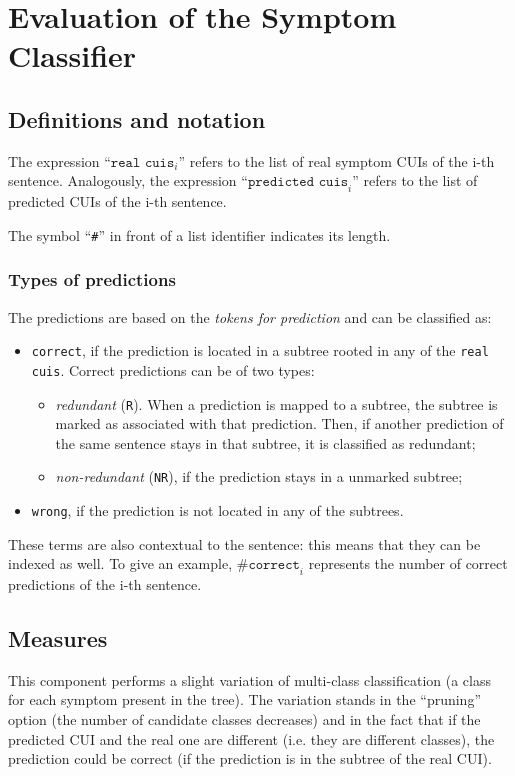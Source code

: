 \section{Evaluation of the Symptom Classifier}
\label{sec:evalsymptomclassifier}
\subsection{Definitions and notation}

The expression ``$\texttt{real cuis}_{i}$'' refers to the list of real symptom CUIs of the i-th sentence. Analogously, the expression ``$\texttt{predicted cuis}_{i}$'' refers to the list of predicted CUIs of the i-th sentence.

The symbol ``\texttt{\#}'' in front of a list identifier indicates its length.

\subsubsection{Types of predictions}
The predictions are based on the \textit{tokens for prediction} and can be classified as:
\begin{itemize}
  \item \texttt{correct}, if the prediction is located in a subtree rooted in any of the \texttt{real cuis}. Correct predictions can be of two types:
    \begin{itemize}
      \item \textit{redundant} (\texttt{R}). When a prediction is mapped to a subtree, the subtree is marked as associated with that prediction. Then, if another prediction of the same sentence stays in that subtree, it is classified as redundant;
      \item \textit{non-redundant} (\texttt{NR}), if the prediction stays in a unmarked subtree;
    \end{itemize}
  \item \texttt{wrong}, if the prediction is not located in any of the subtrees.
\end{itemize}

These terms are also contextual to the sentence: this means that they can be indexed as well. To give an example, $\texttt{\#correct}_{i}$ represents the number of correct predictions of the i-th sentence.

\subsection{Measures}
This component performs a slight variation of multi-class classification (a class for each symptom present in the tree). The variation stands in the ``pruning'' option (the number of candidate classes decreases) and in the fact that if the predicted CUI and the real one are different (i.e. they are different classes), the prediction could be correct (if the prediction is in the subtree of the real CUI).


